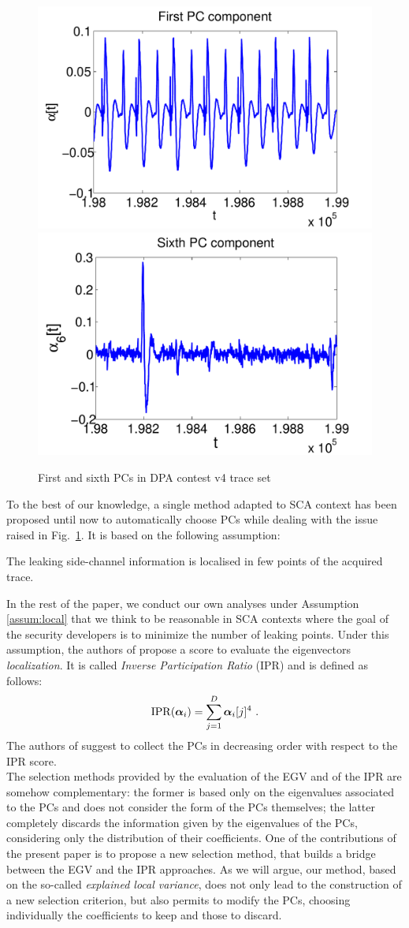 \begin{figure}
\includegraphics[width=.45\textwidth]{figures/DPAcontestPC1.pdf} 
\includegraphics[width=.45\textwidth]{figures/DPAcontestPC6.pdf} 
\caption{First and sixth PCs in DPA contest v4 trace set}\label{fig:DPAcontest}
\end{figure}
To the best of our knowledge, a single method adapted to SCA context has been proposed until now to automatically choose PCs \cite{SCAclassProbl} while dealing with the issue raised in Fig.~\ref{fig:DPAcontest}. It is based on the following assumption:
\begin{assumption}\label{assum:local}
The leaking side-channel information is localised in few points of the acquired trace.
\end{assumption}
In the rest of the paper, we conduct our own analyses under Assumption \ref{assum:local} that we think to be reasonable in SCA contexts where the goal of the security developers is to minimize the number of leaking points.
Under this assumption, the authors of \cite{SCAclassProbl} propose a score to evaluate the eigenvectors {\em localization}. It is called {\em Inverse Participation Ratio} (IPR) and is defined as follows:
\begin{equation}
\mathrm{IPR}(\boldsymbol\alpha_i) = \sum_{j=1}^D \boldsymbol\alpha_i[j]^4 \mbox{ .}
\end{equation}
The authors of \cite{SCAclassProbl} suggest to collect the PCs in decreasing order with respect to the IPR score.\\

The selection methods provided by the evaluation of the EGV and of the IPR are somehow complementary: the former is based only on the eigenvalues associated to the PCs and does not consider the form of the PCs themselves; the latter completely discards the information given by the eigenvalues of the PCs, considering only the distribution of their coefficients. One of the contributions of the present paper is to propose a new selection method, that builds a bridge between the EGV and the IPR approaches. As we will argue, our method, based on the so-called {\em explained local variance}, does not only lead to the construction of a new selection criterion, but also permits  to modify the PCs, choosing individually the coefficients to keep and those to discard. 

